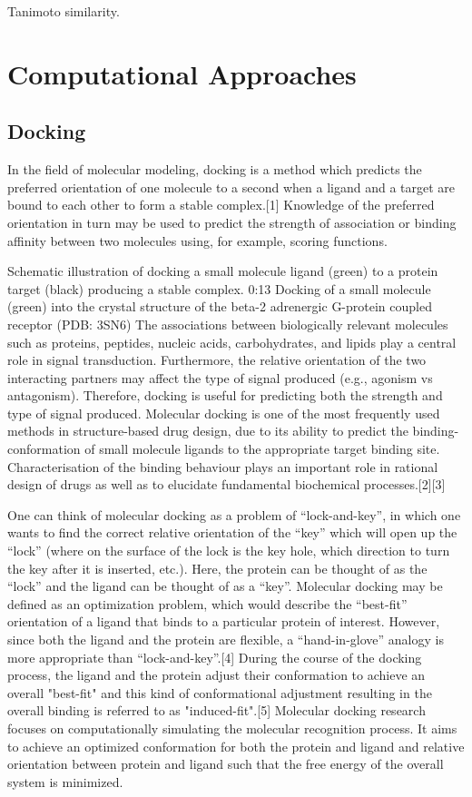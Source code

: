 Tanimoto similarity.

\section{Computational Approaches}

\subsection{Docking}

In the field of molecular modeling, docking is a method which predicts the preferred orientation of one molecule to a second when a ligand and a target are bound to each other to form a stable complex.[1] Knowledge of the preferred orientation in turn may be used to predict the strength of association or binding affinity between two molecules using, for example, scoring functions.

Schematic illustration of docking a small molecule ligand (green) to a protein target (black) producing a stable complex.
0:13
Docking of a small molecule (green) into the crystal structure of the beta-2 adrenergic G-protein coupled receptor (PDB: 3SN6)
The associations between biologically relevant molecules such as proteins, peptides, nucleic acids, carbohydrates, and lipids play a central role in signal transduction. Furthermore, the relative orientation of the two interacting partners may affect the type of signal produced (e.g., agonism vs antagonism). Therefore, docking is useful for predicting both the strength and type of signal produced.
Molecular docking is one of the most frequently used methods in structure-based drug design, due to its ability to predict the binding-conformation of small molecule ligands to the appropriate target binding site. Characterisation of the binding behaviour plays an important role in rational design of drugs as well as to elucidate fundamental biochemical processes.[2][3]

One can think of molecular docking as a problem of “lock-and-key”, in which one wants to find the correct relative orientation of the “key” which will open up the “lock” (where on the surface of the lock is the key hole, which direction to turn the key after it is inserted, etc.). Here, the protein can be thought of as the “lock” and the ligand can be thought of as a “key”. Molecular docking may be defined as an optimization problem, which would describe the “best-fit” orientation of a ligand that binds to a particular protein of interest. However, since both the ligand and the protein are flexible, a “hand-in-glove” analogy is more appropriate than “lock-and-key”.[4] During the course of the docking process, the ligand and the protein adjust their conformation to achieve an overall "best-fit" and this kind of conformational adjustment resulting in the overall binding is referred to as "induced-fit".[5]
Molecular docking research focuses on computationally simulating the molecular recognition process. It aims to achieve an optimized conformation for both the protein and ligand and relative orientation between protein and ligand such that the free energy of the overall system is minimized.

